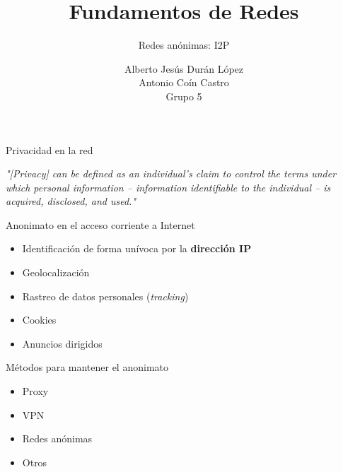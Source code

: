 \documentclass[spanish]{beamer}
\title{Fundamentos de Redes}
\subtitle{Redes anónimas: I2P}
\author{Alberto Jesús Durán López\\ Antonio Coín Castro\\ \vspace{1em}Grupo 5}
\begin{document}
\maketitle



\begin{frame}{Privacidad en la red}
	
	\textit{"[Privacy] can be defined as an individual's claim to control the terms under which personal information -- information identifiable to the individual -- is acquired, disclosed, and used."}

	
\end{frame}



\begin{frame}{Anonimato en el acceso corriente a Internet}

\begin{itemize}
	\item Identificación de forma unívoca por la \textbf{dirección IP}
	\item Geolocalización
    \item Rastreo de datos personales (\textit{tracking})\\ 
    \item Cookies
    \item Anuncios dirigidos
\end{itemize}

\end{frame}  



\begin{frame}{Métodos para mantener el anonimato}
	
\begin{itemize}
	\item Proxy \\
	\item VPN\\ 
	\item Redes anónimas\\
	\item Otros
\end{itemize}	
	
\end{frame}
\end{document}
